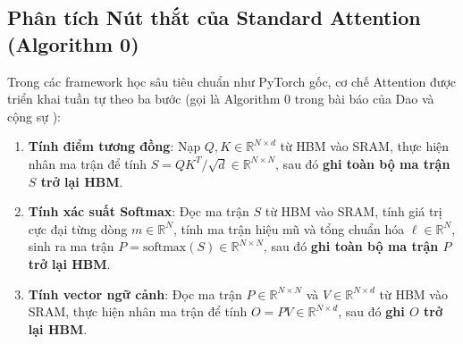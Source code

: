\documentclass[10pt,a4paper]{article}
\begin{document}
\subsection{Phân tích Nút thắt của Standard Attention (Algorithm 0)}
Trong các framework học sâu tiêu chuẩn như PyTorch gốc, cơ chế Attention được triển khai tuần tự theo ba bước (gọi là Algorithm 0 trong bài báo của Dao và cộng sự \cite{dao2022flashattention}):
\begin{enumerate}
    \item \textbf{Tính điểm tương đồng}: Nạp $Q, K \in \mathbb{R}^{N \times d}$ từ HBM vào SRAM, thực hiện nhân ma trận để tính $S = QK^T / \sqrt{d} \in \mathbb{R}^{N \times N}$, sau đó \textbf{ghi toàn bộ ma trận $S$ trở lại HBM}.
    \item \textbf{Tính xác suất Softmax}: Đọc ma trận $S$ từ HBM vào SRAM, tính giá trị cực đại từng dòng $m \in \mathbb{R}^N$, tính ma trận hiệu mũ và tổng chuẩn hóa $\ell \in \mathbb{R}^N$, sinh ra ma trận $P = \text{softmax}(S) \in \mathbb{R}^{N \times N}$, sau đó \textbf{ghi toàn bộ ma trận $P$ trở lại HBM}.
    \item \textbf{Tính vector ngữ cảnh}: Đọc ma trận $P \in \mathbb{R}^{N \times N}$ và $V \in \mathbb{R}^{N \times d}$ từ HBM vào SRAM, thực hiện nhân ma trận để tính $O = PV \in \mathbb{R}^{N \times d}$, sau đó \textbf{ghi $O$ trở lại HBM}.
\end{enumerate}
\end{document}
